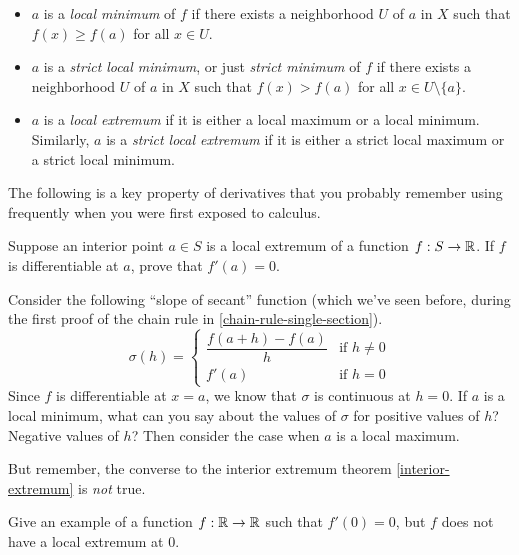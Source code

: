 \begin{definition}
\begin{itemize}
		\item $a$ is a \emph{local minimum} of $f$ if there exists a neighborhood $U$ of $a$ in $X$ such that $f(x) \geq f(a)$ for all $x \in U$. 
		\item $a$ is a \emph{strict local minimum}, or just \emph{strict minimum} of $f$ if there exists a neighborhood $U$ of $a$ in $X$ such that $f(x) > f(a)$ for all $x \in U \setminus\{a\}$.
		\item $a$ is a \emph{local extremum} if it is either a local maximum or a local minimum. Similarly, $a$ is a \emph{strict local extremum} if it is either a strict local maximum or a strict local minimum. 
	\end{itemize}
\end{definition}


The following is a key property of derivatives that you probably remember using frequently when you were first exposed to calculus. 

\begin{exercise} \label{interior-extremum}  
	Suppose an interior point $a \in S$ is a local extremum of a function $f : S \to \mathbb{R}$. If $f$ is differentiable at $a$, prove that $f'(a) = 0$.
	\begin{hint} 
		Consider the following ``slope of secant'' function (which we've seen before, during the first proof of the chain rule in \cref{chain-rule-single-section}).
		\[ \sigma(h) = \begin{cases} \dfrac{f(a+h)-f(a)}{h} & \text{if } h \neq 0 \\ f'(a) & \text{if } h = 0 \end{cases} \]
		Since $f$ is differentiable at $x = a$, we know that $\sigma$ is continuous at $h = 0$. If $a$ is a local minimum, what can you say about the values of $\sigma$ for positive values of $h$? Negative values of $h$? Then consider the case when $a$ is a local maximum. 
	\end{hint}
\end{exercise}

But remember, the converse to the interior extremum theorem \ref{interior-extremum} is \emph{not} true. 

\begin{exercise} \label{interior-extremum-converse-false}
	Give an example of a function $f : \mathbb{R} \to \mathbb{R}$ such that $f'(0) = 0$, but $f$ does not have a local extremum at 0. 
\end{exercise}

